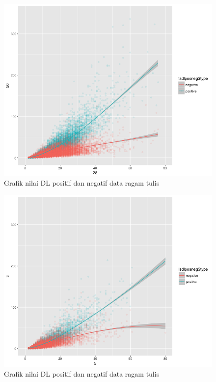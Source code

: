 \begin{figure}
	\centering \includegraphics[width=1
	\textwidth] {pics/tulis_DLposneg.png} 
	\caption{Grafik nilai DL positif dan negatif data ragam tulis}
	\label{fig:tulis_DLposneg} 
\end{figure}

\begin{figure}
	\centering \includegraphics[width=1
	\textwidth] {pics/lisan_DLposneg.png} 
	\caption{Grafik nilai DL positif dan negatif data ragam tulis}
	\label{fig:lisan_DLposneg} 
\end{figure}

